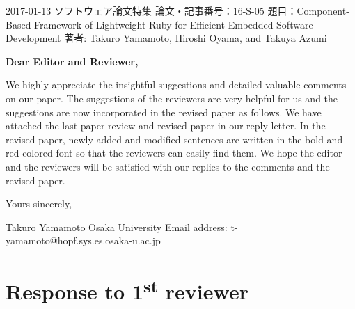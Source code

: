\documentclass{article}
\newcommand\st{\textsuperscript{st}\xspace}
\begin{document}
\begin{flushleft}
  2017-01-13\newline 
  ソフトウェア論文特集\newline
  論文・記事番号：16-S-05\newline
  題目：Component-Based Framework of Lightweight Ruby for Efficient Embedded Software Development\newline
  著者: Takuro Yamamoto, Hiroshi Oyama, and Takuya Azumi\newline
\end{flushleft}

\textbf{Dear Editor and Reviewer,}\newline

We highly appreciate the insightful suggestions and detailed valuable comments on our paper.
The suggestions of the reviewers are very helpful for us and the suggestions are now incorporated in the revised paper as follows.
We have attached the last paper review and revised paper in our reply letter.
In the revised paper, newly added and modified sentences are written in the bold and red colored font so that the reviewers can easily find them.
We hope the editor and the reviewers will be satisfied with our replies to the comments and the revised paper.
\newline\newline

\begin{flushleft}
  Yours sincerely,\newline

  Takuro Yamamoto\newline
  Osaka University\newline
  Email address: t-yamamoto@hopf.sys.es.osaka-u.ac.jp\newline
\end{flushleft}

\clearpage

\section{Response to 1\st reviewer}
\end{document}
